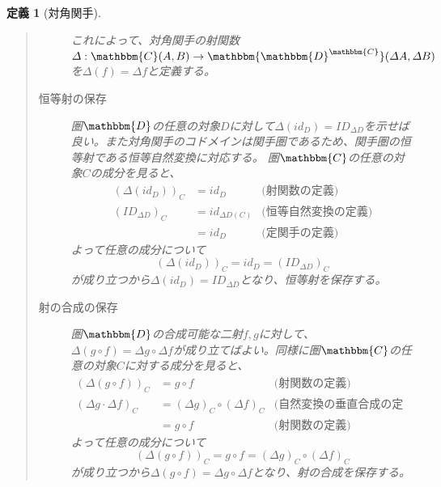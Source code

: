 \documentclass[uplatex,dvipdfmx]{jsarticle}
\newcommand{\cat}[1]{\mathbbm{#1}}
\newcommand{\arrow}{\rightarrow}
\newcommand{\mor}[3]{#1:#2\arrow #3}
\newcommand{\arset}[3]{\cat{#1}(#2,#3)}
\newcommand{\funccat}[2]{\cat{#2}^\cat{#1}}
\newtheorem{define}{定義}[section]
\numberwithin{proof}{subsection}
\numberwithin{prop}{subsection}
\numberwithin{define}{subsection}
\begin{document}
\begin{define}[対角関手]
\begin{quote}
\begin{description}
\begin{center}
        \end{center}

        これによって、対角関手の射関数$\mor{\varDelta}{\arset{C}{A}{B}}{\arset{\funccat{C}{D}}{\varDelta A}{\varDelta B}}$を$\varDelta(f)=\varDelta f$と定義する。

				\item[恒等射の保存] 圏$\cat{D}$の任意の対象$D$に対して$\varDelta(id_D)=ID_{\varDelta D}$を示せば良い。また対角関手のコドメインは関手圏であるため、関手圏の恒等射である恒等自然変換に対応する。
        圏$\cat{C}$の任意の対象$C$の成分を見ると、
        \begin{align*}
          (\varDelta (id_D))_C &= id_D &\text{(射関数の定義)}\\
          (ID_{\varDelta D})_C &= id_{\varDelta D(C)}&\text{(恒等自然変換の定義)}\\
          &= id_D&\text{(定関手の定義)}
        \end{align*}
        よって任意の成分について\[(\varDelta (id_D))_C=id_D=(ID_{\varDelta D})_C\]が成り立つから$\varDelta(id_D)=ID_{\varDelta D}$となり、恒等射を保存する。

				\item[射の合成の保存] 圏$\cat{D}$の合成可能な二射$f,g$に対して、$\varDelta(g\circ f)=\varDelta g\circ \varDelta f$が成り立てばよい。同様に圏$\cat{C}$の任意の対象$C$に対する成分を見ると、
        \begin{align*}
          (\varDelta(g\circ f))_C&=g\circ f&\text{(射関数の定義)}\\
          (\varDelta g\cdot\varDelta f)_C &= (\varDelta g)_C\circ (\varDelta f)_C&\text{(自然変換の垂直合成の定義)}\\
          &=g\circ f&\text{(射関数の定義)}
        \end{align*}
        よって任意の成分について\[(\varDelta(g\circ f))_C=g\circ f=(\varDelta g)_C\circ (\varDelta f)_C\]が成り立つから$\varDelta(g\circ f)=\varDelta g\circ \varDelta f$となり、射の合成を保存する。
			\end{description}
		\end{quote}
  \end{define}
\end{document}

